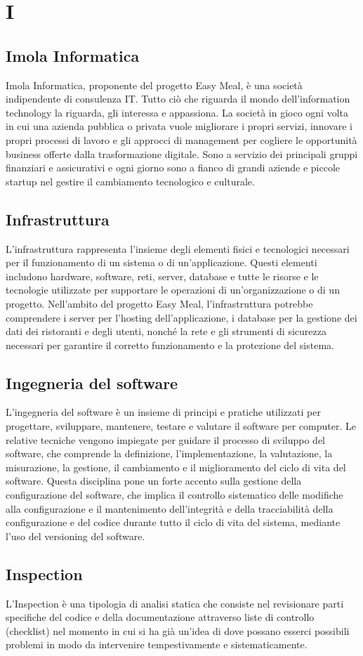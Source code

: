 \section{I} 
\subsection{Imola Informatica} 
Imola Informatica, proponente del progetto Easy Meal, è una società indipendente di consulenza IT. Tutto ciò che riguarda il mondo dell’information technology la riguarda, gli interessa e appassiona. La società in gioco ogni volta in cui una azienda pubblica o privata vuole migliorare i propri servizi, innovare i propri processi di lavoro e gli approcci di management per cogliere le opportunità business offerte dalla trasformazione digitale. Sono a servizio dei principali gruppi finanziari e assicurativi e ogni giorno sono a fianco di grandi aziende e piccole startup nel gestire il cambiamento tecnologico e culturale.
\subsection{Infrastruttura} 
L'infrastruttura rappresenta l'insieme degli elementi fisici e tecnologici necessari per il funzionamento di un sistema o di un'applicazione. Questi elementi includono hardware, software, reti, server, database e tutte le risorse e le tecnologie utilizzate per supportare le operazioni di un'organizzazione o di un progetto. Nell'ambito del progetto Easy Meal, l'infrastruttura potrebbe comprendere i server per l'hosting dell'applicazione, i database per la gestione dei dati dei ristoranti e degli utenti, nonché la rete e gli strumenti di sicurezza necessari per garantire il corretto funzionamento e la protezione del sistema.
\subsection{Ingegneria del software} 
L'ingegneria del software è un insieme di principi e pratiche utilizzati per progettare, sviluppare, mantenere, testare e valutare il software per computer. Le relative tecniche vengono impiegate per guidare il processo di sviluppo del software, che comprende la definizione, l'implementazione, la valutazione, la misurazione, la gestione, il cambiamento e il miglioramento del ciclo di vita del software. Questa disciplina pone un forte accento sulla gestione della configurazione del software, che implica il controllo sistematico delle modifiche alla configurazione e il mantenimento dell'integrità e della tracciabilità della configurazione e del codice durante tutto il ciclo di vita del sistema, mediante l'uso del versioning del software.
\subsection{Inspection} 
L'Inspection è una tipologia di analisi statica che consiste nel revisionare parti specifiche del codice e della documentazione attraverso liste di controllo (checklist) nel momento in cui si ha già un’idea di dove possano esserci possibili problemi in modo da intervenire tempestivamente e sistematicamente.
